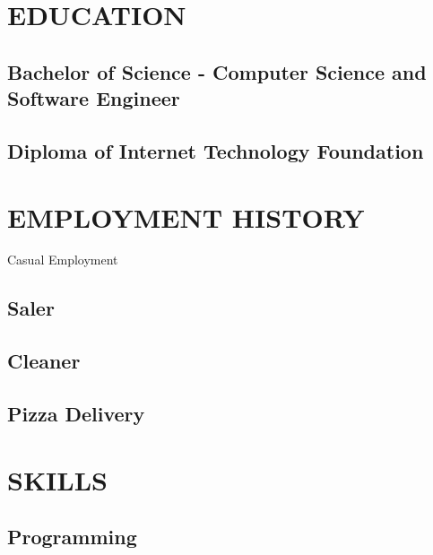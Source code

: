 \documentclass{res}
\begin{document}
 

\address{\bf  30 Tranmere Avenue\\Carnegie, VIC 3163}

\begin{resume}
\section{EDUCATION}
\subsection{Bachelor of Science - Computer Science and Software Engineer}
\subsection{Diploma of Internet Technology Foundation}
 
\section{EMPLOYMENT HISTORY}
Casual Employment
\subsection{Saler}
\subsection{Cleaner}
\subsection{Pizza Delivery}



\section{SKILLS}
\subsection{Programming}
	

\end{resume}
\end{document}
